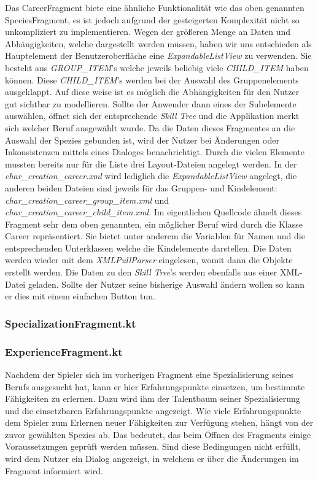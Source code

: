 Das CareerFragment biete eine ähnliche Funktionalität wie das oben genannten SpeciesFragment, es ist jedoch aufgrund der gesteigerten Komplexität nicht so unkompliziert zu implementieren. Wegen der größeren Menge an Daten und Abhängigkeiten, welche dargestellt werden müssen, haben wir uns entschieden als Hauptelement der Benutzeroberfläche eine \textit{ExpandableListView} zu verwenden. Sie besteht aus \textit{GROUP\_ITEM}'s welche jeweils beliebig viele \textit{CHILD\_ITEM} haben können. Diese \textit{CHILD\_ITEM}'s werden bei der Auswahl des Gruppenelements \grqq ausgeklappt\grqq{}. Auf diese weise ist es möglich die Abhängigkeiten für den Nutzer gut sichtbar zu modellieren. Sollte der Anwender dann eines der Subelemente auswählen, öffnet sich der entsprechende \textit{Skill Tree} und die Applikation merkt sich welcher Beruf ausgewählt wurde. Da die Daten dieses Fragmentes an die Auswahl der Spezies gebunden ist, wird der Nutzer bei Änderungen oder Inkonsistenzen mittels eines Dialoges benachrichtigt. Durch die vielen Elemente mussten bereits nur für die Liste drei Layout-Dateien angelegt werden. In der \textit{char\_creation\_career.xml} wird lediglich die \textit{ExpandableListView} angelegt, die anderen beiden Dateien sind jeweils für das Gruppen- und Kindelement: \textit{char\_creation\_career\_group\_item.xml} und \textit{char\_creation\_career\_child\_item.xml}. Im eigentlichen Quellcode ähnelt dieses Fragment sehr dem oben genannten, ein möglicher Beruf wird durch die Klasse Career repräsentiert. Sie bietet unter anderem die Variablen für Namen und die entsprechenden Unterklassen welche die Kindelemente darstellen. Die Daten werden wieder mit dem  \textit{XMLPullParser} eingelesen, womit dann die Objekte erstellt werden. Die Daten zu den \textit{Skill Tree}'s werden ebenfalls aus einer XML-Datei geladen. Sollte der Nutzer seine bisherige Auswahl ändern wollen so kann er dies mit einem einfachen Button tun.

\subsubsection{SpecializationFragment.kt}

\subsubsection{ExperienceFragment.kt}
Nachdem der Spieler sich im vorherigen Fragment eine Spezialisierung seines Berufs ausgesucht hat, kann er hier Erfahrungspunkte einsetzen, um bestimmte Fähigkeiten zu erlernen. Dazu wird ihm der Talentbaum seiner Spezialisierung und die einsetzbaren Erfahrungspunkte angezeigt. Wie viele Erfahrungspunkte dem Spieler zum Erlernen neuer Fähigkeiten zur Verfügung stehen, hängt von der zuvor gewählten Spezies ab. Das bedeutet, das beim Öffnen des Fragments einige Voraussetzungen geprüft werden müssen. Sind diese Bedingungen nicht erfüllt, wird dem Nutzer ein Dialog angezeigt, in welchem er über die Änderungen im Fragment informiert wird.\\


